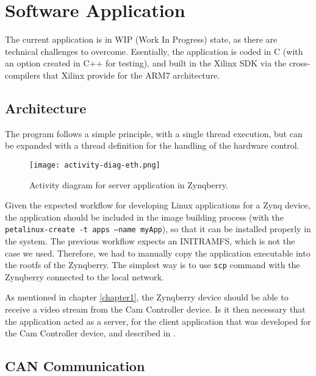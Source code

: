 
\chapter{Software Application} \label{software-application}

The current application is in WIP (Work In Progress) state, as there are technical challenges to
overcome. Esentially, the application is coded in C (with an option created in C++ for testing), and
built in the Xilinx SDK via the cross-compilers that Xilinx provide for the ARM7 architecture.

\section{Architecture}

The program follows a simple principle, with a single thread execution, but can be expanded with a
thread definition for the handling of the hardware control.

\begin{figure}[htp]
	\centering
	\texttt{[image: activity-diag-eth.png]}
	\caption{Activity diagram for server application in Zynqberry.}
	\label{fig:activity-diag-eth}
\end{figure}

Given the expected workflow for developing Linux applications for a Zynq device, the application
should be included in the image building process (with the
\texttt{petalinux-create -t apps --name myApp}), so that it can be installed properly in the system.
The previous workflow expects an INITRAMFS, which is not the case we used. Therefore, we had to
manually copy the application executable into the rootfs of the Zynqberry. The simplest way is to
use \texttt{scp} command with the Zynqberry connected to the local network.

As mentioned in chapter \ref{chapter1}, the Zynqberry device should be able to receive a video
stream from the Cam Controller device. Is it then necessary that the application acted as a server,
for the client application that was developed for the Cam Controller device, and described in
\cite{Poliakov2018}.

\section{CAN Communication}

